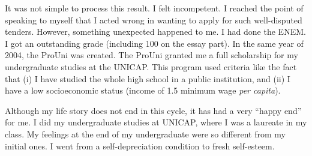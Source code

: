It was not simple to process this result. I felt incompetent. I reached the point of speaking to myself that I acted wrong in wanting to apply for such well-disputed tenders. However, something unexpected happened to me. I had done the \gls{ENEM}. I got an outstanding grade (including 100 on the essay part). In the same year of 2004, the \gls{ProUni} was created. The \gls{ProUni} granted me a full scholarship for my undergraduate studies at the \gls{UNICAP}. This program used criteria like the fact that (i) I have studied the whole high school in a public institution, and (ii) I have a low socioeconomic status (income of 1.5 minimum wage \textit{per capita}).

Although my life story does not end in this cycle, it has had a very “happy end” for me. I did my undergraduate studies at \gls{UNICAP}, where I was a laureate in my class. My feelings at the end of my undergraduate were so different from my initial ones. I went from a self-depreciation condition to fresh self-esteem.


                

        
                
